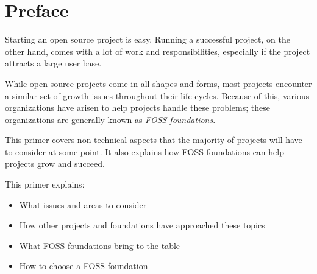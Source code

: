 


\chapter*{Preface}

Starting an open source project is easy.  Running a successful project, on the other hand, comes with a lot of work and responsibilities, especially if the project attracts a large user base.

While open source projects come in all shapes and forms, most projects encounter a similar set of growth issues throughout their life cycles.  Because of this, various organizations have arisen to help projects handle these problems; these organizations are generally known as \textit{FOSS foundations}.

This primer covers non-technical aspects that the majority of projects will have to consider at some point.  It also explains how FOSS foundations can help projects grow and succeed.

This primer explains:

\begin{itemize}

\item What issues and areas to consider

\item How other projects and foundations have approached these topics

\item What FOSS foundations bring to the table

\item How to choose a FOSS foundation

\end{itemize}

